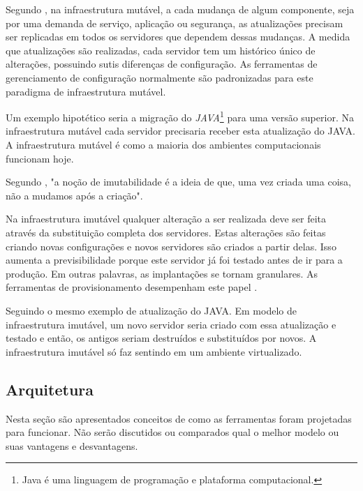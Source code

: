 Segundo , na infraestrutura mutável, a cada mudança de algum componente, seja por uma demanda de serviço, aplicação ou segurança, as atualizações precisam ser replicadas em todos os servidores que dependem dessas mudanças. A medida que atualizações são realizadas, cada servidor tem um histórico único de alterações, possuindo sutis diferenças de configuração. As ferramentas de gerenciamento de configuração normalmente são padronizadas para este paradigma de infraestrutura mutável.

Um exemplo hipotético seria a migração do \textit{JAVA}\footnote{Java é uma linguagem de programação e plataforma computacional.} para uma versão superior. Na infraestrutura mutável cada servidor precisaria receber esta atualização do JAVA. A infraestrutura mutável é como a maioria dos ambientes computacionais funcionam hoje.
 
 Segundo , "a noção de imutabilidade é a ideia de que, uma vez criada uma coisa, não a mudamos após a criação".
 
 \hfill
 
 Na infraestrutura imutável qualquer alteração a ser realizada deve ser feita através da substituição completa dos servidores. Estas alterações são feitas criando novas configurações e novos servidores são criados a partir delas. Isso aumenta a previsibilidade porque este servidor já foi testado antes de ir para a produção. Em outras palavras, as implantações se tornam granulares. As ferramentas de provisionamento desempenham este papel \cite{Morris:2016:ICM:3006361}.
 
  Seguindo o mesmo exemplo de atualização do JAVA. Em modelo de infraestrutura imutável, um novo servidor seria criado com essa atualização e testado e então, os antigos seriam destruídos e substituídos por novos. A infraestrutura imutável só faz sentindo em um ambiente virtualizado. 
 
\subsection{Arquitetura}

Nesta seção são apresentados conceitos de como as ferramentas foram projetadas para funcionar. Não serão discutidos ou comparados qual o melhor modelo ou suas vantagens e desvantagens. 

